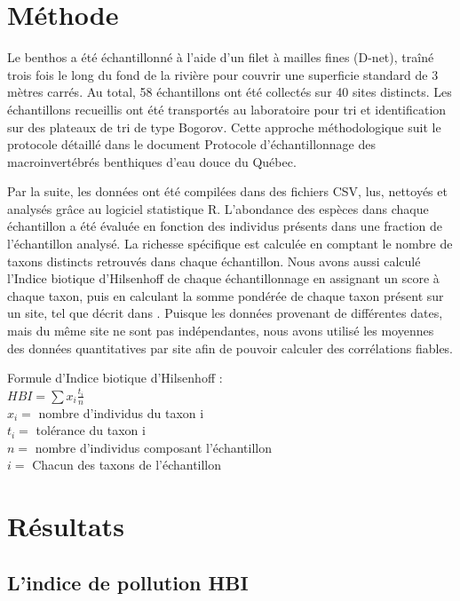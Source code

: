 \documentclass[cm,linguex]{glossa}
\begin{document}
\hypertarget{muxe9thode}{%
\section{Méthode}\label{muxe9thode}}

Le benthos a été échantillonné à l'aide d'un filet à mailles fines
(D-net), traîné trois fois le long du fond de la rivière pour couvrir
une superficie standard de 3 mètres carrés. Au total, 58 échantillons
ont été collectés sur 40 sites distincts. Les échantillons recueillis
ont été transportés au laboratoire pour tri et identification sur des
plateaux de tri de type Bogorov. Cette approche méthodologique suit le
protocole détaillé dans le document Protocole d'échantillonnage des
macroinvertébrés benthiques d'eau douce du Québec.

Par la suite, les données ont été compilées dans des fichiers CSV, lus,
nettoyés et analysés grâce au logiciel statistique R. L'abondance des
espèces dans chaque échantillon a été évaluée en fonction des individus
présents dans une fraction de l'échantillon analysé. La richesse
spécifique est calculée en comptant le nombre de taxons distincts
retrouvés dans chaque échantillon. Nous avons aussi calculé l'Indice
biotique d'Hilsenhoff de chaque échantillonnage en assignant un score à
chaque taxon, puis en calculant la somme pondérée de chaque taxon
présent sur un site, tel que décrit dans \citet{moisan_guide_2013}.
Puisque les données provenant de différentes dates, mais du même site ne
sont pas indépendantes, nous avons utilisé les moyennes des données
quantitatives par site afin de pouvoir calculer des corrélations
fiables.

Formule d'Indice biotique d'Hilsenhoff :\\
\(HBI = \sum x_i\frac{t_i}{n}\)\\
\(x_i =\) nombre d'individus du taxon i\\
\(t_i =\) tolérance du taxon i\\
\(n =\) nombre d'individus composant l'échantillon\\
\(i =\) Chacun des taxons de l'échantillon

\hypertarget{ruxe9sultats}{%
\section{Résultats}\label{ruxe9sultats}}

\hypertarget{lindice-de-pollution-hbi}{%
\subsection{L'indice de pollution HBI}\label{lindice-de-pollution-hbi}}
\end{document}
